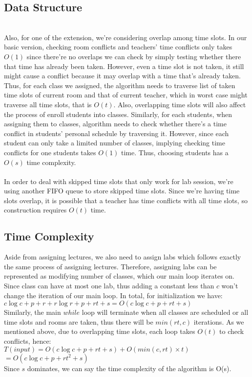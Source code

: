 \documentclass[11pt, oneside]{article}   	%
\begin{document}
\subsection{Data Structure}
\\Also, for one of the extension, we're considering overlap among time slots. In our basic version, checking room conflicts and teachers' time conflicts only takes $O(1)$ since there're no overlaps we can check by simply testing whether there that time has already been taken. However, even a time slot is not taken, it still might cause a conflict because it may overlap with a time that's already taken. Thus, for each class we assigned, the algorithm needs to traverse list of taken time slots of current room and that of current teacher, which in worst case might traverse all time slots, that is $O(t)$. Also, overlapping time slots will also affect the process of enroll students into classes. Similarly, for each students, when assigning them to classes, algorithm needs to check whether there's a time conflict in students' personal schedule by traversing it. However, since each student can only take a limited number of classes, implying checking time conflicts for one students takes $O(1)$ time. Thus, choosing students has a $O(s)$ time complexity.\\
\\In order to deal with skipped time slots that only work for lab session, we're using another FIFO queue to store skipped time slots. Since we're having time slots overlap, it is possible that a teacher has time conflicts with all time slots, so construction requires $O(t)$ time.\\
\subsection{Time Complexity}
Aside from assigning lectures, we also need to assign labs which follows exactly the same process of assigning lectures. Therefore, assigning labs can be represented as modifying number of classes, which our main loop iterates on. Since class can have at most one lab, thus adding a constant less than $c$ won't change the iteration of our main loop. In total, for initialization we have: 
\\\hspace*{30mm}$c\log c + p + r + r\log r+ p + rt + s = O(c\log c + p + rt + s)$
\\Similarly, the main $while$ loop will terminate when all classes are scheduled or all time slots and rooms are taken, thus there will be $min(rt, c)$ iterations. As we mentioned above, due to overlapping time slots, each loop takes $O(t)$ to check conflicts, hence:
\\\hspace*{30mm}$T(input) =  O(c\log c + p + rt + s) + O(min(c, rt)\times t)$
\\\hspace*{46mm}$=O(c\log c + p + rt^2 + s)$\\
Since $s$ dominates, we can say the time complexity of the algorithm is O(s).
\end{document}
